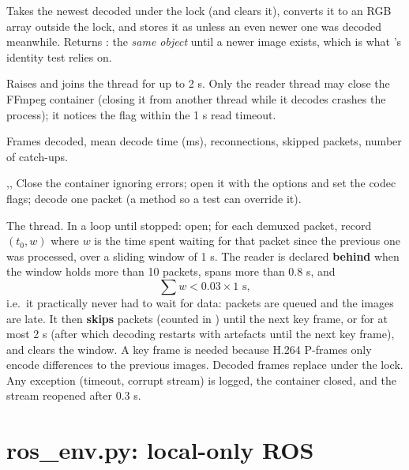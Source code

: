 Takes the newest decoded  under the lock (and clears it), converts it to an RGB array outside
the lock, and stores it as  unless an even newer one was decoded meanwhile. Returns :
the \emph{same object} until a newer image exists, which is what 's identity test relies on.

Raises  and joins the thread for up to 2 s. Only the reader thread may close the FFmpeg container
(closing it from another thread while it decodes crashes the process); it notices the flag within the 1 s read
timeout.

Frames decoded, mean decode time (ms), reconnections, skipped packets, number of catch-ups.

,\quad {},\quad {}
Close the container ignoring errors; open it with the options and set the codec flags; decode one packet (a method
so a test can override it).

The thread. In a loop until stopped: open; for each demuxed packet, record $(t_0, w)$ where $w$ is the time spent
waiting for that packet since the previous one was processed, over a sliding window of 1 s. The reader is declared
\textbf{behind} when the window holds more than 10 packets, spans more than 0.8 s, and
$$
\sum w < 0.03 \times 1\text{ s},
$$
i.e.\ it practically never had to wait for data: packets are queued and the images are late. It then
\textbf{skips} packets (counted in ) until the next key frame, or for at most 2 s (after which decoding
restarts with artefacts until the next key frame), and clears the window. A key frame is needed because H.264
P-frames only encode differences to the previous images. Decoded frames replace  under the lock.
Any exception (timeout, corrupt stream) is logged, the container closed, and the stream reopened after 0.3 s.

\section{ros\_env.py: local-only ROS}
\label{sec:rosenv}

